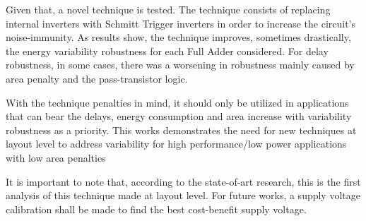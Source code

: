 \documentclass[ecp,tc, english]{iiufrgs}
\begin{document}
Given that, a novel technique is tested. The technique consists of replacing internal inverters with Schmitt Trigger inverters in order to increase the circuit’s noise-immunity. As results show, the technique improves, sometimes drastically, the energy variability robustness for each Full Adder considered. For delay robustness, in some cases, there was a worsening in robustness mainly caused by area penalty and the pass-transistor logic.

With the technique penalties in mind, it should only be utilized in applications that can bear the delays, energy consumption and area increase with variability robustness as a priority. This works demonstrates the need for new techniques at layout level to address variability for high performance/low power applications with low area penalties

It is important to note that, according to the state-of-art research, this is the first analysis of this technique made at layout level. For future works, a supply voltage calibration shall be made to find the best cost-benefit supply voltage.   




\end{document}
